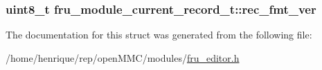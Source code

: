 \hypertarget{structfru__module__current__record__t_a103d214aa7283a502186aa8d2122d39a}{
\subsubsection[{rec\-\_\-fmt\-\_\-ver}]{\setlength{\rightskip}{0pt plus 5cm}uint8\-\_\-t fru\-\_\-module\-\_\-current\-\_\-record\-\_\-t\-::rec\-\_\-fmt\-\_\-ver}}\label{structfru__module__current__record__t_a103d214aa7283a502186aa8d2122d39a}


The documentation for this struct was generated from the following file\-:\begin{DoxyCompactItemize}
\item 
/home/henrique/rep/open\-M\-M\-C/modules/\hyperlink{fru__editor_8h}{fru\-\_\-editor.\-h}\end{DoxyCompactItemize}
